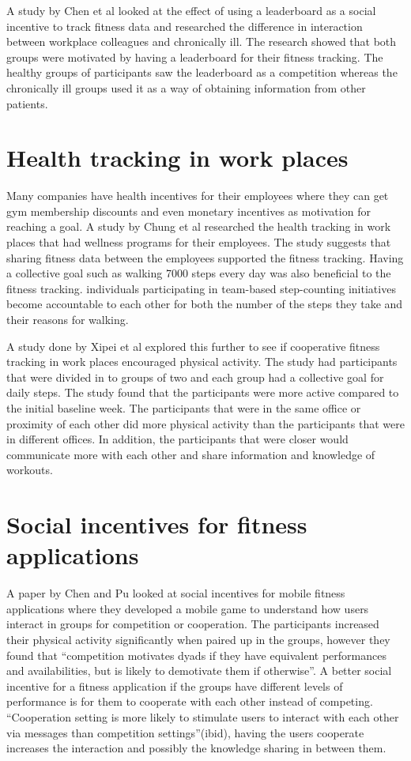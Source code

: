 A study by Chen et al\cite{Chen2017} looked at the effect of using a leaderboard as a social incentive to track fitness data and researched the difference in interaction between workplace colleagues and chronically ill. The research showed that both groups were motivated by having a leaderboard for their fitness tracking. The healthy groups of participants saw the leaderboard as a competition whereas the chronically ill groups used it as a way of obtaining information from other patients. 

\section{Health tracking in work places}
Many companies have health incentives for their employees where they can get gym membership discounts and even monetary incentives as motivation for reaching a goal. A study by Chung et al\cite{Chung2017} researched the health tracking in work places that had wellness programs for their employees. The study suggests that sharing fitness data between the employees supported the fitness tracking. Having a collective goal such as walking 7000 steps every day was also beneficial to the fitness tracking.  individuals participating in team-based step-counting initiatives become accountable to each other for both the number of the steps they take and their reasons for walking. \cite{Buis2009}

A study done by Xipei et al\cite{Ren2018} explored this further to see if cooperative fitness tracking in work places encouraged physical activity. The study had participants that were divided in to groups of two and each group had a collective goal for daily steps. The study found that the participants were more active compared to the initial baseline week. The participants that were in the same office or proximity of each other did more physical activity than the participants that were in different offices. In addition, the participants that were closer would communicate more with each other and share information and knowledge of workouts. 

\section{Social incentives for fitness applications}
A paper by Chen and Pu\cite{Chen2017} looked at social incentives for mobile fitness applications where they developed a mobile game to understand how users interact in groups for competition or cooperation. The participants increased their physical activity significantly when paired up in the groups, however they found that “competition motivates dyads if they have equivalent performances and availabilities, but is likely to demotivate them if otherwise”\cite{Chen2017}. A better social incentive for a fitness application if the groups have different levels of performance is for them to cooperate with each other instead of competing.  “Cooperation setting is more likely to stimulate users to interact with each other via messages than competition settings”(ibid), having the users cooperate increases the interaction and possibly the knowledge sharing in between them.

